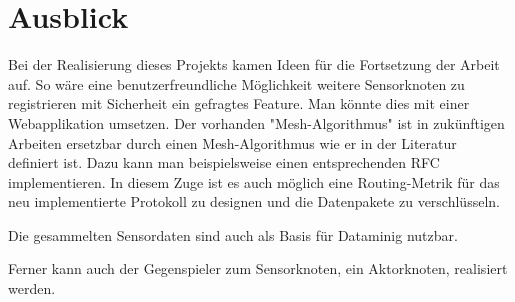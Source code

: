 \section{Ausblick}
Bei der Realisierung dieses Projekts kamen Ideen für die Fortsetzung der Arbeit auf. So wäre eine benutzerfreundliche Möglichkeit weitere Sensorknoten zu registrieren mit Sicherheit ein gefragtes Feature. Man könnte dies mit einer Webapplikation umsetzen.
Der vorhanden "Mesh-Algorithmus" ist in zukünftigen Arbeiten ersetzbar durch einen Mesh-Algorithmus wie er in der Literatur definiert ist. Dazu kann man beispielsweise einen entsprechenden RFC implementieren. In diesem Zuge ist es auch möglich eine Routing-Metrik für das neu implementierte Protokoll zu designen und die Datenpakete zu verschlüsseln. 

Die gesammelten Sensordaten sind auch als Basis für Dataminig nutzbar.

Ferner kann auch der Gegenspieler zum Sensorknoten, ein Aktorknoten, realisiert werden.

 